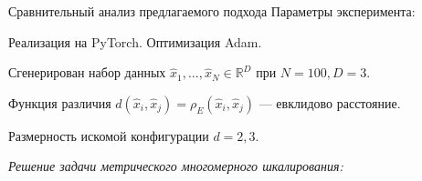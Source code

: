 \documentclass[9pt]{beamer}
\newcommand{\real}{\mathbb{R}}
\begin{document}
\begin{frame}{Сравнительный анализ предлагаемого подхода}
Параметры эксперимента:

    Реализация на PyTorch. Оптимизация Adam.
    
    Сгенерирован набор данных $\hat{x}_1, ..., \hat{x}_N \in \real^{D}$ при $N=100, D=3$. 
    
    Функция различия $d(\hat{x}_i, \hat{x}_j) = \rho_E (\hat{x}_i, \hat{x}_j)$ --- евклидово расстояние.
    
    Размерность искомой конфигурации $d=2, 3$.
    
    \vspace{\baselineskip} 
    \textit{Решение задачи метрического многомерного шкалирования:}
    
    
\begin{table}[h]

\quad
{}
\end{table}
\end{frame}
\end{document}
